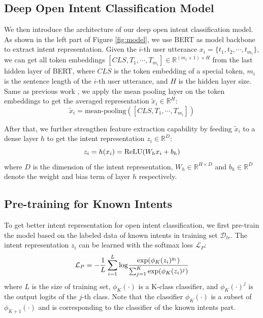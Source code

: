\documentclass[journal]{IEEEtran}
\begin{document}
\subsection{Deep Open Intent Classification Model}
We then introduce the architecture of our deep open intent classification model.
As shown in the left part of Figure \ref{fig:model}, we use BERT \cite{Devlin19} as model backbone to extract intent representation.
Given the $i$-th user utterance $x_i = \{t_1,t_2,\cdots,t_{m_i}\}$, we can get all token embeddings $[CLS,T_1,\cdots,T_{m_i}] \in \mathbb{R}^{({m_i}+1) \times H}$ from the last hidden layer of BERT, where $CLS$ is the token embedding of a special token, $m_i$ is the sentence length of the $i$-th user utterance, and $H$ is the hidden layer size.
Same as previous work \cite{Lin20,zhang21}, we apply the mean pooling layer on the token embeddings to get the averaged representation $\tilde{x}_i \in \mathbb{R}^H$:
\begin{equation}
    \tilde{x}_i = \text{mean-pooling}([CLS,T_1,\cdots,T_{m_i}])
\end{equation}

After that, we further strengthen feature extraction capability by feeding $\tilde{x}_i$ to a dense layer $h$ to get the intent representation $z_i \in \mathbb{R}^D$:
\begin{equation}
    z_i = h(x_i) = {\rm ReLU}(W_hx_i+b_h)
\end{equation}
where $D$ is the dimension of the intent representation, $W_h \in \mathbb{R}^{H \times D}$ and $b_h \in \mathbb{R}^{D}$ denote the weight and bias term of layer $h$ respectively.


\subsection{Pre-training for Known Intents}
To get better intent representation for open intent classification, we first pre-train the model based on the labeled data of known intents in training set $\mathcal{D}_{tr}$.
The intent representation $z_i$ can be learned with the softmax loss $\mathcal{L}_P$:
\begin{equation}
    \mathcal{L}_P = -\frac{1}{L} \sum_{i=1}^L {\rm log} \frac{{\rm exp}(\phi_K(z_i)^{y_i})}{\sum_{j=1}^K {\rm exp}(\phi_K(z_i)^j)}
\end{equation}
where $L$ is the size of training set, $\phi_K(\cdot)$ is a K-class classifier, and $\phi_K(\cdot)^j$ is the output logits of the $j$-th class.
Note that the classifier $\phi_K(\cdot)$ is a subset of $\phi_{K+1}(\cdot)$ and is corresponding to the classifier of the known intents part.
\end{document}
